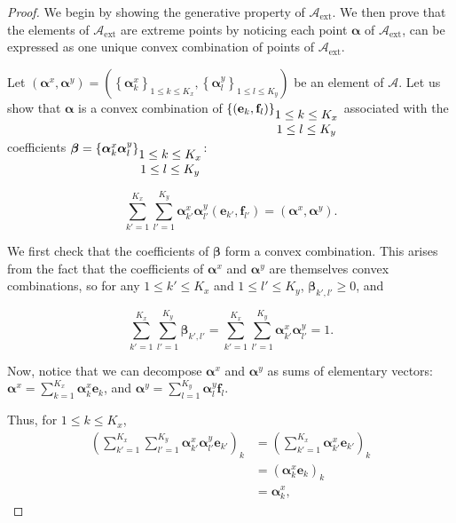 \documentclass[10pt,a4paper]{amsart}
\def\aalpha{\boldsymbol{\alpha}}
\def\bbeta{\boldsymbol{\beta}}
\def\cA{\mathcal{A}}
\def\ee{\mathbf{e}}
\def\ff{\mathbf{f}}
\begin{document}
\begin{proof}
We begin by showing the generative property of $\cA_{\text{ext}}$. We then prove that the elements of $\cA_{\text{ext}}$ are extreme points by noticing each point $\aalpha$ of $\cA_{\text{ext}}$, can be expressed as one unique convex combination of points of $\cA_{\text{ext}} $.

Let $(\aalpha^x, \aalpha^y) = \left(\left\lbrace \aalpha_{k}^x \right\rbrace_{1 \leq k \leq K_x}, \left\lbrace \aalpha_{l}^y \right\rbrace_{1\leq l \leq K_y} \right)$ be an element of $\cA$. Let us show that $\aalpha$ is a convex combination of  $\left\lbrace \left( \ee_{k}, \ff_{l}\right) \right\rbrace_{\footnotesize \begin{matrix} 1 \leq k \leq K_x \\ 1\leq l \leq K_y \end{matrix}}$ associated with the coefficients $\bbeta = \left\lbrace \aalpha_{k}^x \aalpha_{l}^y\right\rbrace_{\footnotesize \begin{matrix} 1 \leq k \leq K_x \\ 1\leq l \leq K_y \end{matrix}} $:


\begin{equation}
    \sum_{k' = 1}^{K_x} \sum_{l' = 1}^{K_y} \aalpha_{k'}^x\aalpha_{l'}^y (\ee_{k'}, \ff_{l'})  = (\aalpha^x, \aalpha^y).
\end{equation}

We first check that the coefficients of $\bbeta$ form a convex combination. This arises from the fact that the coefficients of $\aalpha^x$ and $\aalpha^y$ are themselves  convex combinations, so for any $1\leq k' \leq K_x$ and $1 \leq l' \leq K_y$, $\bbeta_{k', l'} \geq 0$, and


\begin{equation}
   \sum_{k' = 1}^{K_x} \sum_{l' = 1}^{K_y} \bbeta_{k', l'} = \sum_{k' = 1}^{K_x} \sum_{l' = 1}^{K_y} \aalpha_{k'}^x\aalpha_{l'}^y  = 1 .
\end{equation}



Now, notice that we can decompose $\aalpha^x$ and $\aalpha^y$ as sums of elementary vectors: $\displaystyle  \aalpha^x = \sum_{k = 1}^{K_x} \aalpha^x_{k} \ee_{k}$, and $\displaystyle  \aalpha^y = \sum_{l = 1}^{K_y} \aalpha^y_{l} \ff_{l}$.

Thus, for $1 \leq k \leq K_x$, 
\begin{equation}
    \begin{array}{ll}
        \displaystyle{} \left(\sum_{k' = 1}^{K_x} \sum_{l' = 1}^{K_y} \aalpha_{k'}^x \aalpha_{l'}^y \ee_{k'}\right)_{k} & = \displaystyle{}
          \left(\sum_{k' = 1}^{K_x} \aalpha_{k'}^x \ee_{k'} \right)_{k}\\
         & \displaystyle{} =  (\aalpha_{k}^x \ee_{k})_{k} \\
         &\displaystyle{} = \aalpha^x_{k},
    \end{array}
\end{equation}


\end{proof}
\end{document}
